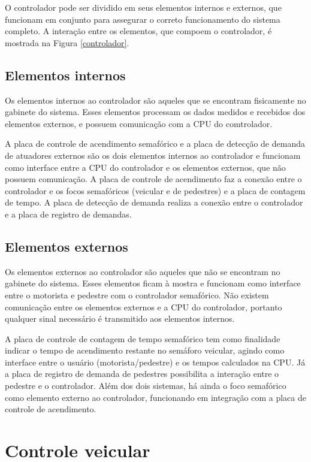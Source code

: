 O controlador pode ser dividido em seus elementos internos e externos, que funcionam em conjunto para assegurar o correto funcionamento do sistema completo. A interação entre os elementos, que compoem o controlador, é mostrada na Figura \ref{controlador}. 

\subsection{Elementos internos}

Os elementos internos ao controlador são aqueles que se encontram fisicamente no gabinete do sistema. Esses elementos processam os dados medidos e recebidos dos elementos externos, e possuem comunicação com a \ac{CPU} do comtrolador.

A placa de controle de acendimento semafórico e a placa de detecção de demanda de atuadores externos são os dois elementos internos ao controlador e funcionam como interface entre a \ac{CPU} do controlador e os elementos externos, que não possuem comunicação.
A placa de controle de acendimento faz a conexão entre o controlador e os focos semafóricos (veicular e de pedestres) e a placa de contagem de tempo. A placa de detecção de demanda realiza a conexão entre o controlador e a placa de registro de demandas.

\subsection{Elementos externos}

Os elementos externos ao controlador são aqueles que não se encontram no gabinete do sistema. Esses elementos ficam à mostra e funcionam como interface entre o motorista e pedestre com o controlador semafórico. Não existem comunicação entre os elementos externos e a \ac{CPU} do controlador, portanto qualquer sinal necessário é transmitido aos elementos internos.

A placa de controle de contagem de tempo semafórico tem como finalidade indicar o tempo de acendimento restante no semáforo veicular, agindo como interface entre o usuário (motorista/pedestre) e os tempos calculados na \ac{CPU}. Já a placa de registro de demanda de pedestres possibilita a interação entre o pedestre e o controlador. Além dos dois sistemas, há ainda o foco semafórico como elemento externo ao controlador, funcionando em integração com a placa de controle de acendimento.

\section{Controle veicular}

